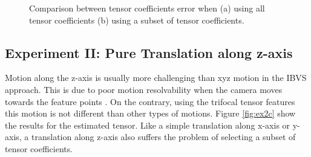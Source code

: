 \begin{figure}[ht!]
\begin{subfigure}{.48\linewidth}
    \caption{}
    \label{fig:ex1comparisonb}
  \end{subfigure}
  \caption{Comparison between tensor coefficients error when (a) using all tensor coefficients (b) using a subset of tensor coefficients.}
  \label{fig:ex1comparison}
\end{figure}

\subsection{Experiment II: Pure Translation along z-axis}
Motion along the z-axis is usually more challenging than xyz motion in the IBVS approach. This is due to poor motion resolvability when the camera moves towards the feature points \cite{nelson1996vision}. On the contrary, using the trifocal tensor features this motion is not different than other types of motions. Figure \ref{fig:ex2c} show the results for the estimated tensor. Like a simple translation along x-axis or y-axis, a translation along z-axis also suffers the problem of selecting a subset of tensor coefficients.


